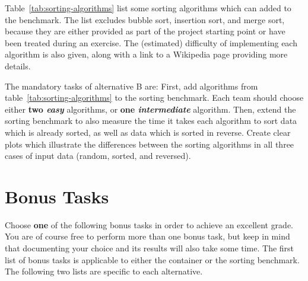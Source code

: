 \documentclass[a4paper,10pt]{article}
\begin{document}
Table~\ref{tab:sorting-algorithms} list some sorting algorithms which can added to the benchmark.
The list excludes bubble sort, insertion sort, and merge sort, because they are either provided as part of the project starting point or have been treated during an exercise.
The (estimated) difficulty of implementing each algorithm is also given, along with a link to a Wikipedia page providing more details.

The mandatory tasks of alternative B are:
First, add algorithms from table~\ref{tab:sorting-algorithms} to the sorting benchmark.
Each team should choose either \textbf{two \emph{easy}} algorithms, or \textbf{one \emph{intermediate}} algorithm.
Then, extend the sorting benchmark to also measure the time it takes each algorithm to sort data which is already sorted, as well as data which is sorted in reverse.
Create clear plots which illustrate the differences between the sorting algorithms in all three cases of input data (random, sorted, and reversed).



\section{Bonus Tasks}\label{sec:tasks2}

Choose \textbf{one} of the following bonus tasks in order to achieve an excellent grade.
You are of course free to perform more than one bonus task, but keep in mind that documenting your choice and its results will also take some time.
The first list of bonus tasks is applicable to either the container or the sorting benchmark.
The following two lists are specific to each alternative.
\end{document}
